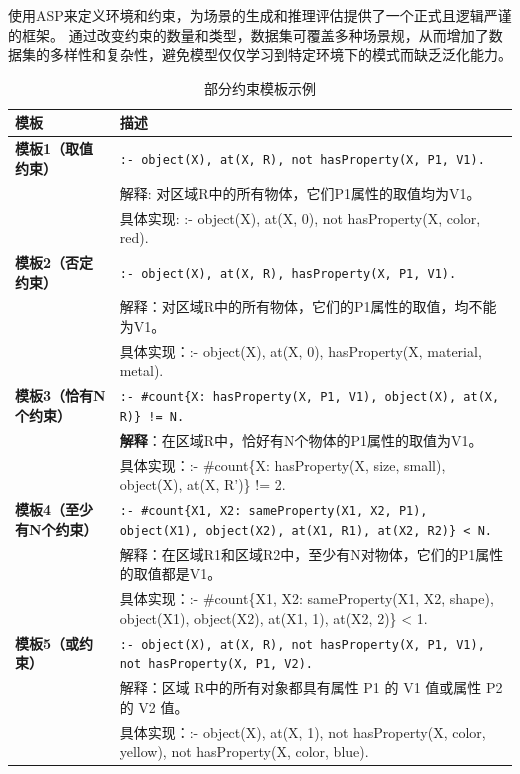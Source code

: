 使用ASP来定义环境和约束，为场景的生成和推理评估提供了一个正式且逻辑严谨的框架。
通过改变约束的数量和类型，数据集可覆盖多种场景规，从而增加了数据集的多样性和复杂性，避免模型仅仅学习到特定环境下的模式而缺乏泛化能力。
\begin{table}[!h]
    \centering
    \renewcommand{\arraystretch}{1.0}
    \begin{tabular}{|p{3cm}|p{12cm}|}
        \hline
        \textbf{模板} & \textbf{描述} \\
        \hline
        \textbf{模板1（取值约束）} & 
        \texttt{:- object(X), at(X, R), not hasProperty(X, P1, V1).} \\ 
        & 解释: 对区域R中的所有物体，它们P1属性的取值均为V1。 \\ 
        & 具体实现: :- object(X), at(X, 0), not hasProperty(X, color, red). \\
        \hline
        
        \textbf{模板2（否定约束）} & 
        \texttt{:- object(X), at(X, R), hasProperty(X, P1, V1).} \\ 
        & 解释：对区域R中的所有物体，它们的P1属性的取值，均不能为V1。 \\ 
        & 具体实现：:- object(X), at(X, 0), hasProperty(X, material, metal). \\
        \hline
        
        \textbf{模板3（恰有N个约束）} & 
        \texttt{:- \#count\{X: hasProperty(X, P1, V1), object(X), at(X, R)\} != N.} \\ 
        & \textbf{解释}：在区域R中，恰好有N个物体的P1属性的取值为V1。 \\ 
        & 具体实现：:- \#count\{X: hasProperty(X, size, small), object(X), at(X, R')\} != 2. \\
        \hline
        
        \textbf{模板4（至少有N个约束）} & 
        \texttt{:- \#count\{X1, X2: sameProperty(X1, X2, P1), object(X1), object(X2), at(X1, R1), at(X2, R2)\} < N.} \\ 
        & 解释：在区域R1和区域R2中，至少有N对物体，它们的P1属性的取值都是V1。 \\ 
        & 具体实现：:- \#count\{X1, X2: sameProperty(X1, X2, shape), object(X1), object(X2), at(X1, 1), at(X2, 2)\} < 1. \\
        \hline
        
        \textbf{模板5（或约束）} & 
        \texttt{:- object(X), at(X, R), not hasProperty(X, P1, V1), not hasProperty(X, P1, V2).} \\ 
        & 解释：区域 R中的所有对象都具有属性 P1 的 V1 值或属性 P2 的 V2 值。 \\ 
        & 具体实现：:- object(X), at(X, 1), not hasProperty(X, color, yellow), not hasProperty(X, color, blue). \\
        \hline
    \end{tabular}
    \caption{部分约束模板示例}
    \label{tab:asp_templates}
\end{table}
